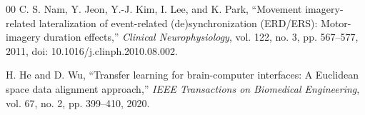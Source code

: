\begin{thebibliography}{00}
C. S. Nam, Y. Jeon, Y.-J. Kim, I. Lee, and K. Park, ``Movement imagery-related
lateralization of event-related (de)synchronization (ERD/ERS): Motor-imagery duration
effects,'' \textit{Clinical Neurophysiology}, vol. 122, no. 3, pp. 567--577, 2011,
doi: 10.1016/j.clinph.2010.08.002.

H. He and D. Wu, ``Transfer learning for brain-computer interfaces: A Euclidean space
data alignment approach,'' \textit{IEEE Transactions on Biomedical Engineering}, vol. 67,
no. 2, pp. 399--410, 2020.

\end{thebibliography}
